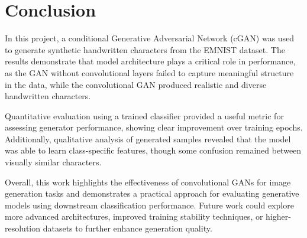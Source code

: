 \documentclass[titlepage]{article}
\begin{document}
\section{Conclusion}

In this project, a conditional Generative Adversarial Network (cGAN) was used to generate synthetic handwritten characters from the EMNIST dataset. The results demonstrate that model architecture plays a critical role in performance, as the GAN without convolutional layers failed to capture meaningful structure in the data, while the convolutional GAN produced realistic and diverse handwritten characters. 

Quantitative evaluation using a trained classifier provided a useful metric for assessing generator performance, showing clear improvement over training epochs. Additionally, qualitative analysis of generated samples revealed that the model was able to learn class-specific features, though some confusion remained between visually similar characters.

Overall, this work highlights the effectiveness of convolutional GANs for image generation tasks and demonstrates a practical approach for evaluating generative models using downstream classification performance. Future work could explore more advanced architectures, improved training stability techniques, or higher-resolution datasets to further enhance generation quality.

\newpage


\end{document}
